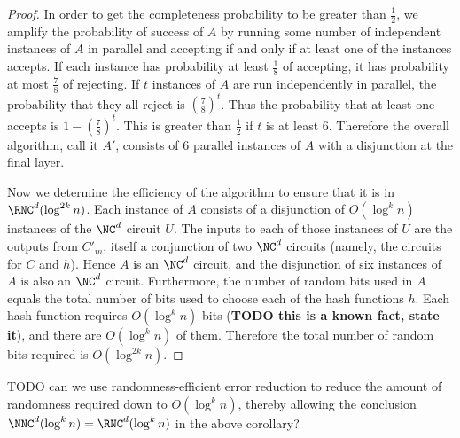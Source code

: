 \documentclass{article}
\begin{document}
\begin{proof}
  In order to get the completeness probability to be greater than $\frac{1}{2}$, we amplify the probability of success of $A$ by running some number of independent instances of $A$ in parallel and accepting if and only if at least one of the instances accepts.
  If each instance has probability at least $\frac{1}{8}$ of accepting, it has probability at most $\frac{7}{8}$ of rejecting.
  If $t$ instances of $A$ are run independently in parallel, the probability that they all reject is $(\frac{7}{8})^t$.
  Thus the probability that at least one accepts is $1 - (\frac{7}{8})^t$.
  This is greater than $\frac{1}{2}$ if $t$ is at least 6.
  Therefore the overall algorithm, call it $A'$, consists of 6 parallel instances of $A$ with a disjunction at the final layer.

  Now we determine the efficiency of the algorithm to ensure that it is in $\RNC^d(\log^{2k} n)$.
  Each instance of $A$ consists of a disjunction of $O(\log^k n)$ instances of the $\NC^d$ circuit $U$.
  The inputs to each of those instances of $U$ are the outputs from $C'_m$, itself a conjunction of two $\NC^d$ circuits (namely, the circuits for $C$ and $h$).
  Hence $A$ is an $\NC^d$ circuit, and the disjunction of six instances of $A$ is also an $\NC^d$ circuit.
  Furthermore, the number of random bits used in $A$ equals the total number of bits used to choose each of the hash functions $h$.
  Each hash function requires $O(\log^k n)$ bits (\textbf{TODO this is a known fact, state it}), and there are $O(\log^k n)$ of them.
  Therefore the total number of random bits required is $O(\log^{2k} n)$.
\end{proof}

TODO can we use randomness-efficient error reduction to reduce the amount of randomness required down to $O(\log^k n)$, thereby allowing the conclusion $\NNC^d(\log^k n) = \RNC^d(\log^k n)$ in the above corollary?



\end{document}
